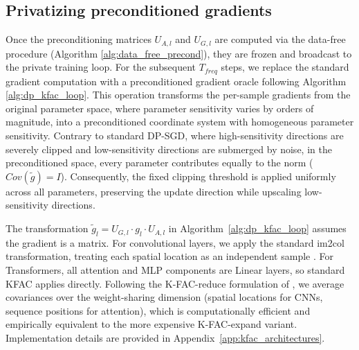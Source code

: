 \documentclass{article}
\theoremstyle{plain}
\theoremstyle{definition}
\theoremstyle{remark}
\begin{document}
\subsection{Privatizing preconditioned gradients}
\label{subsec:optdyn}

Once the preconditioning matrices $U_{A,l}$ and $U_{G,l}$ are computed via the data-free procedure (Algorithm \ref{alg:data_free_precond}), they are frozen and broadcast to the private training loop. For the subsequent $T_{freq}$ steps, we replace the standard gradient computation with a preconditioned gradient oracle following Algorithm \ref{alg:dp_kfac_loop}. This operation transforms the per-sample gradients from the original parameter space, where parameter sensitivity varies by orders of magnitude, into a preconditioned coordinate system with homogeneous parameter sensitivity. Contrary to standard DP-SGD, where high-sensitivity directions are severely clipped and low-sensitivity directions are submerged by noise, in the preconditioned space, every parameter contributes equally to the norm ($Cov(\tilde g)= I$). Consequently, the fixed clipping threshold is applied uniformly across all parameters, preserving the update direction while upscaling low-sensitivity directions. 

The transformation $\tilde{g}_l = U_{G,l} \cdot g_l \cdot U_{A,l}$ in Algorithm~\ref{alg:dp_kfac_loop} assumes the gradient is a matrix. For convolutional layers, we apply the standard im2col transformation, treating each spatial location as an independent sample \cite{DBLP:journals/corr/MartensG15}. For Transformers, all attention and MLP components are Linear layers, so standard KFAC applies directly. Following the K-FAC-reduce formulation of \citet{eschenhagen2023kfac}, we average covariances over the weight-sharing dimension (spatial locations for CNNs, sequence positions for attention), which is computationally efficient and empirically equivalent to the more expensive K-FAC-expand variant. Implementation details are provided in Appendix~\ref{app:kfac_architectures}.
\end{document}

